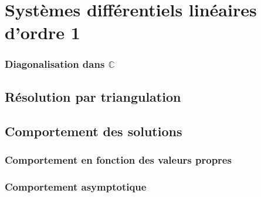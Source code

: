 \section{Systèmes différentiels linéaires d'ordre 1}

\subsubsection{Diagonalisation dans $\mathbb{C}$}
\subsection{Résolution par triangulation}
\subsection{Comportement des solutions}
\subsubsection{Comportement en fonction des valeurs propres}
\subsubsection{Comportement asymptotique}
